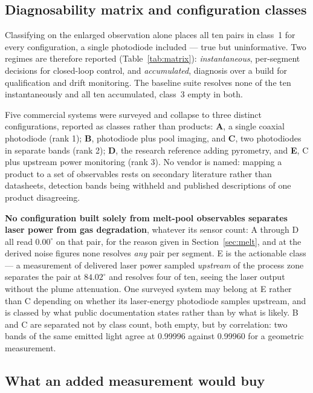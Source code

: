 \documentclass[final,5p,times,twocolumn]{elsarticle}
\begin{document}
\subsection{Diagnosability matrix and configuration classes}

Classifying on the enlarged observation alone places all ten pairs in class~1 for
every configuration, a single photodiode included --- true but uninformative. Two
regimes are therefore reported (Table~\ref{tab:matrix}): \emph{instantaneous},
per-segment decisions for closed-loop control, and \emph{accumulated}, diagnosis
over a build for qualification and drift monitoring. The baseline suite resolves none of the ten instantaneously and all ten
accumulated, class~3 empty in both.

Five commercial systems were surveyed and collapse to three distinct
configurations, reported as classes rather than products: \textbf{A}, a single
coaxial photodiode (rank 1); \textbf{B}, photodiode plus pool imaging, and
\textbf{C}, two photodiodes in separate bands (rank 2); \textbf{D}, the research
reference adding pyrometry, and \textbf{E}, C plus upstream power monitoring
(rank 3). No vendor is named: mapping a product to a set of observables rests on
secondary literature rather than datasheets, detection bands being withheld and
published descriptions of one product disagreeing.

\textbf{No configuration built solely from melt-pool observables separates laser
power from gas degradation}, whatever its sensor count: A through D all read
$0.00^\circ$ on that pair, for the reason given in Section~\ref{sec:melt}, and at
the derived noise figures none resolves \emph{any} pair per segment. E is the
actionable class --- a measurement of delivered laser power sampled
\emph{upstream} of the process zone separates the pair at $84.02^\circ$ and
resolves four of ten, seeing the laser output without the plume attenuation. One
surveyed system may belong at E rather than C depending on whether its
laser-energy photodiode samples upstream, and is classed by what public
documentation states rather than by what is likely. B and C are separated not by
class count, both empty, but by correlation: two bands of the same emitted light
agree at 0.99996 against 0.99960 for a geometric measurement.

\subsection{What an added measurement would buy}
\label{sec:added}
\end{document}
